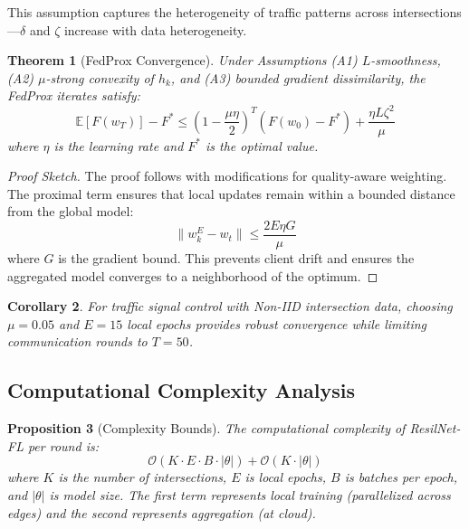 \documentclass[conference]{IEEEtran}
\newtheorem{theorem}{Theorem}
\newtheorem{proposition}[theorem]{Proposition}
\newtheorem{corollary}[theorem]{Corollary}
\begin{document}
This assumption captures the heterogeneity of traffic patterns across intersections---$\delta$ and $\zeta$ increase with data heterogeneity.

\begin{theorem}[FedProx Convergence]
Under Assumptions (A1) $L$-smoothness, (A2) $\mu$-strong convexity of $h_k$, and (A3) bounded gradient dissimilarity, the FedProx iterates satisfy:
\begin{equation}
\mathbb{E}[F(w_T)] - F^* \leq \left(1 - \frac{\mu \eta}{2}\right)^T (F(w_0) - F^*) + \frac{\eta L \zeta^2}{\mu}
\end{equation}
where $\eta$ is the learning rate and $F^*$ is the optimal value.
\end{theorem}

\begin{proof}[Proof Sketch]
The proof follows \cite{li2020fedprox} with modifications for quality-aware weighting. The proximal term ensures that local updates remain within a bounded distance from the global model:
\begin{equation}
\|w_k^E - w_t\| \leq \frac{2E\eta G}{\mu}
\end{equation}
where $G$ is the gradient bound. This prevents client drift and ensures the aggregated model converges to a neighborhood of the optimum.
\end{proof}

\begin{corollary}
For traffic signal control with Non-IID intersection data, choosing $\mu = 0.05$ and $E = 15$ local epochs provides robust convergence while limiting communication rounds to $T = 50$.
\end{corollary}

\subsection{Computational Complexity Analysis}

\begin{proposition}[Complexity Bounds]
The computational complexity of ResilNet-FL per round is:
\begin{equation}
\mathcal{O}(K \cdot E \cdot B \cdot |\theta|) + \mathcal{O}(K \cdot |\theta|)
\end{equation}
where $K$ is the number of intersections, $E$ is local epochs, $B$ is batches per epoch, and $|\theta|$ is model size. The first term represents local training (parallelized across edges) and the second represents aggregation (at cloud).
\end{proposition}
\end{document}
